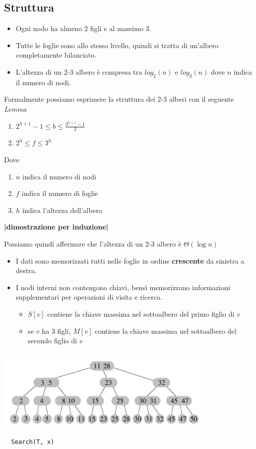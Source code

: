 \documentclass{article}
\begin{document}
\subsection*{Struttura}
\begin{itemize}
  \item Ogni nodo ha almeno 2 figli e al massimo 3.
  \item Tutte le foglie sono allo stesso livello, quindi si tratta di un'albero completamente bilanciato.
  \item L'altezza di un 2-3 albero è compresa tra \(log_2(n)\) e \(log_3(n)\) dove \(n\) indica il numero di nodi.
\end{itemize}
Formalmente possiamo esprimere la struttura dei 2-3 alberi con il seguente \emph{Lemma}
\begin{enumerate}
  \item \(\displaystyle 2^{h+1} - 1 \leq b \leq \frac{3^{h+1} - 1}{2}\)
  \item \(\displaystyle 2^h \leq f \leq 3^h\)
\end{enumerate}
Dove
\begin{enumerate}
  \item \(n\) indica il numero di nodi
  \item \(f\) indica il numero di foglie
  \item \(h\) indica l'altezza dell'albero
\end{enumerate}
\begin{center}
  \textbf{|dimostrazione per induzione|}
\end{center}
Possiamo quindi affermare che l'altezza di un 2-3 albero è \(\Theta(\log n)\)
\begin{itemize}
  \item I dati sono memorizzati tutti nelle foglie in ordine \textbf{crescente} da sinistra a destra.
  \item I nodi interni non contengono chiavi, bensì memorizzano informazioni supplementari per operazioni di visita e ricerca.
        \begin{itemize}
          \item \(S[v]\) contiene la chiave massima nel sottoalbero del primo figlio di \(v\)
          \item se \(v\) ha 3 figli, \(M[v]\) contiene la chiave massima nel sottoalbero del secondo figlio di \(v\)
        \end{itemize}
\end{itemize}
\begin{center}
  \includegraphics[width=0.8\textwidth]{2-3_alberi.png}
\end{center}
\begin{lstlisting}
  Search(T, x)
\end{lstlisting}
\end{document}

